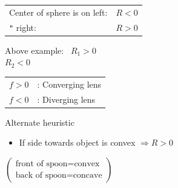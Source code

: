 \documentclass[11pt]{article}
\newcommand{\lensDX}[1][]{\draw[thick,#1] (0,0.65) to[bend left=35] (0,-0.65) to[bend left=35] (0,0.65);}
\newcommand{\lensPX}[1][]{\draw[thick,#1] (0,0.65) -- (0,-0.65) to[bend right=55] (0,0.65);}
\newcommand{\lensMa}[1][]{\draw[thick,#1] (-0.2,0.65) to[bend left=30] (-0.2,-0.65) -- (0.05,-0.65) to[bend right=45] (0.05,0.65) -- cycle;}
\newcommand{\lensMb}[1][]{\draw[thick,#1] (0.2,0.65) to[bend right=30] (0.2,-0.65) -- (-0.05,-0.65) to[bend left=45] (-0.05,0.65) -- cycle;}
\newcommand{\lensPV}[1][]{\draw[thick,#1] (-0.25,0.65) -- (-0.25,-0.65) -- (0.2,-0.65) to[bend left=40] (0.2,0.65) -- cycle;}
\newcommand{\lensDV}[1][]{\draw[thick,#1] (-0.3,0.65) to[bend left=35] (-0.3,-0.65) -- (0.3,-0.65) to[bend left=35] (0.3,0.65) -- cycle;}
\begin{document}
\begin{tabular}{@{}l@{\ }l}
  Center of sphere is on left: & $R < 0$\\
  \hspace*{6em}\texttt{"}\hspace*{4.5em} right: & $R > 0$
\end{tabular}

\hspace*{3em}Above example: \ $R_1 > 0$\\
\hspace*{11.3em}$R_2 < 0$

\begin{tabular}{@{}l@{\quad}l}
  $f > 0$ & : Converging lens\\
  $f < 0$ & : Diverging lens
\end{tabular}

\newpage
{\large Alternate heuristic}

\begin{itemize}[label=--]
  \item If side towards object is convex $\Rightarrow R > 0$
\end{itemize}

\hspace*{2em}$\left(\begin{array}{l}
  \text{front of spoon} = \text{convex}\\
  \text{back of spoon} = \text{concave}
\end{array}\right)$

\begin{center}
\end{center}
\end{document}
